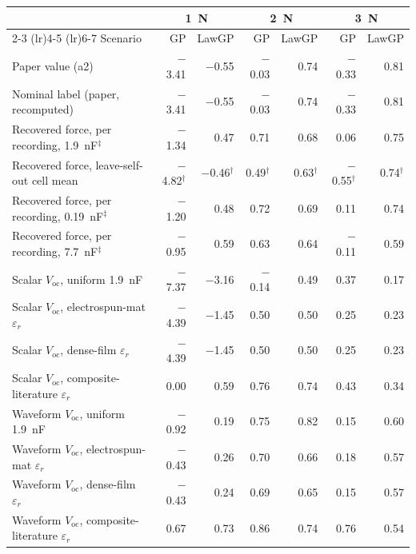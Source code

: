 \begin{tabular}{l rr rr rr}
\toprule
 & \multicolumn{2}{c}{\SI{1}{\newton}} & \multicolumn{2}{c}{\SI{2}{\newton}} & \multicolumn{2}{c}{\SI{3}{\newton}} \\
\cmidrule(lr){2-3} \cmidrule(lr){4-5} \cmidrule(lr){6-7}
Scenario & GP & LawGP & GP & LawGP & GP & LawGP \\
\midrule
Paper value (a2) & $-$3.41 & $-$0.55 & $-$0.03 & 0.74 & $-$0.33 & 0.81 \\
Nominal label (paper, recomputed) & $-$3.41 & $-$0.55 & $-$0.03 & 0.74 & $-$0.33 & 0.81 \\
Recovered force, per recording, \SI{1.9}{\nano\farad}$^\ddagger$ & $-$1.34 & 0.47 & 0.71 & 0.68 & 0.06 & 0.75 \\
Recovered force, leave-self-out cell mean & $-$4.82$^\dagger$ & $-$0.46$^\dagger$ & 0.49$^\dagger$ & 0.63$^\dagger$ & $-$0.55$^\dagger$ & 0.74$^\dagger$ \\
Recovered force, per recording, \SI{0.19}{\nano\farad}$^\ddagger$ & $-$1.20 & 0.48 & 0.72 & 0.69 & 0.11 & 0.74 \\
Recovered force, per recording, \SI{7.7}{\nano\farad}$^\ddagger$ & $-$0.95 & 0.59 & 0.63 & 0.64 & $-$0.11 & 0.59 \\
Scalar $V_\mathrm{oc}$, uniform \SI{1.9}{\nano\farad} & $-$7.37 & $-$3.16 & $-$0.14 & 0.49 & 0.37 & 0.17 \\
Scalar $V_\mathrm{oc}$, electrospun-mat $\varepsilon_r$ & $-$4.39 & $-$1.45 & 0.50 & 0.50 & 0.25 & 0.23 \\
Scalar $V_\mathrm{oc}$, dense-film $\varepsilon_r$ & $-$4.39 & $-$1.45 & 0.50 & 0.50 & 0.25 & 0.23 \\
Scalar $V_\mathrm{oc}$, composite-literature $\varepsilon_r$ & 0.00 & 0.59 & 0.76 & 0.74 & 0.43 & 0.34 \\
Waveform $V_\mathrm{oc}$, uniform \SI{1.9}{\nano\farad} & $-$0.92 & 0.19 & 0.75 & 0.82 & 0.15 & 0.60 \\
Waveform $V_\mathrm{oc}$, electrospun-mat $\varepsilon_r$ & $-$0.43 & 0.26 & 0.70 & 0.66 & 0.18 & 0.57 \\
Waveform $V_\mathrm{oc}$, dense-film $\varepsilon_r$ & $-$0.43 & 0.24 & 0.69 & 0.65 & 0.15 & 0.57 \\
Waveform $V_\mathrm{oc}$, composite-literature $\varepsilon_r$ & 0.67 & 0.73 & 0.86 & 0.74 & 0.76 & 0.54 \\
\bottomrule
\end{tabular}
